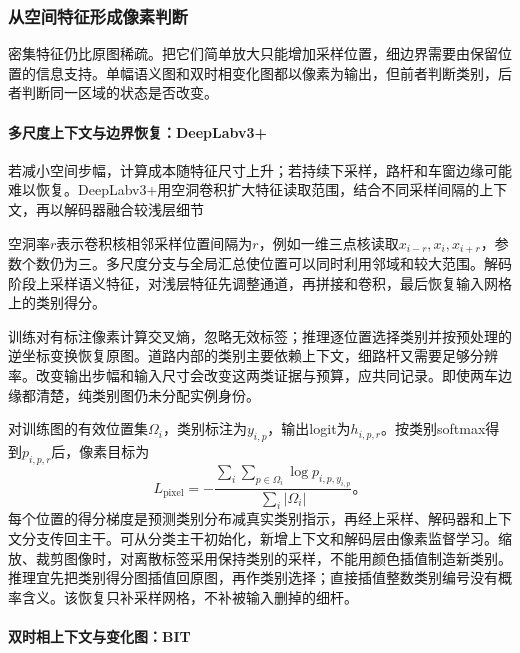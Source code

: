 \subsubsection{从空间特征形成像素判断}
\label{sec:vision-recognition-dense-pixels}

密集特征仍比原图稀疏。把它们简单放大只能增加采样位置，细边界需要由保留位置的信息支持。单幅语义图和双时相变化图都以像素为输出，但前者判断类别，后者判断同一区域的状态是否改变。

\Needspace{60mm}
\paragraph{多尺度上下文与边界恢复：DeepLabv3+}
\label{sec:vision-recognition-deeplab}

若减小空间步幅，计算成本随特征尺寸上升；若持续下采样，路杆和车窗边缘可能难以恢复。DeepLabv3+用空洞卷积扩大特征读取范围，结合不同采样间隔的上下文，再以解码器融合较浅层细节

空洞率$r$表示卷积核相邻采样位置间隔为$r$，例如一维三点核读取$x_{i-r},x_i,x_{i+r}$，参数个数仍为三。多尺度分支与全局汇总使位置可以同时利用邻域和较大范围。解码阶段上采样语义特征，对浅层特征先调整通道，再拼接和卷积，最后恢复输入网格上的类别得分。

训练对有标注像素计算交叉熵，忽略无效标签；推理逐位置选择类别并按预处理的逆坐标变换恢复原图。道路内部的类别主要依赖上下文，细路杆又需要足够分辨率。改变输出步幅和输入尺寸会改变这两类证据与预算，应共同记录。即使两车边缘都清楚，纯类别图仍未分配实例身份。

对训练图的有效位置集$\Omega_i$，类别标注为$y_{i,p}$，输出logit为$h_{i,p,r}$。按类别softmax得到$p_{i,p,r}$后，像素目标为
\begin{equation}
 L_{\mathrm{pixel}}=
 -\frac{\sum_i\sum_{p\in\Omega_i}\log p_{i,p,y_{i,p}}}
        {\sum_i|\Omega_i|}\text{。}
 \label{eq:vision-dense-pixel-training}
\end{equation}
每个位置的得分梯度是预测类别分布减真实类别指示，再经上采样、解码器和上下文分支传回主干。可从分类主干初始化，新增上下文和解码层由像素监督学习。缩放、裁剪图像时，对离散标签采用保持类别的采样，不能用颜色插值制造新类别。推理宜先把类别得分图插值回原图，再作类别选择；直接插值整数类别编号没有概率含义。该恢复只补采样网格，不补被输入删掉的细杆。

\paragraph{双时相上下文与变化图：BIT}
\label{sec:vision-recognition-bit}

